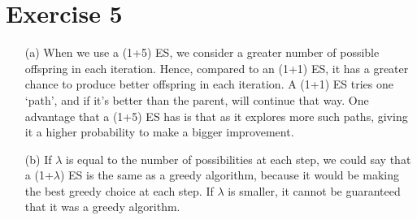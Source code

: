 \documentclass{scrartcl}
\begin{document}
\section*{Exercise 5}
\begin{itemize}
 \item[(a)]
When we use a (1+5) ES, we consider a greater number of possible offspring in each iteration. Hence, compared to an (1+1) ES, it has a greater chance to produce better offspring in each iteration. A (1+1) ES tries one `path', and if it's better than the parent, will continue that way. One advantage that a (1+5) ES has is that as it explores more such paths, giving it a higher probability to make a bigger improvement.

 \item[(b)]
If $\lambda $ is equal to the number of possibilities at each step, we could say that a (1+$\lambda$) ES is the same as a greedy algorithm, because it would be making the best greedy choice at each step. If $\lambda$ is smaller, it cannot be guaranteed that it was a greedy algorithm.
\end{itemize}
\end{document}
